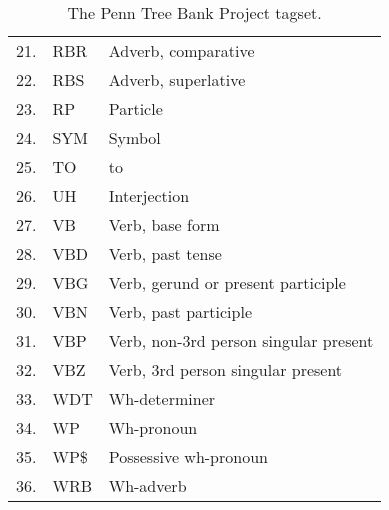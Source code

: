\documentclass[
	a4paper,
	pdftex,
	12pt,	
	footinclude=true,
	fleqn,
	final,
	]{report}%
\begin{document}
\begin{table}[h]
\begin{tabular}{m{1cm} m{2cm} m{9cm}}
21.    & RBR   & Adverb, comparative                      \\
22.    & RBS   & Adverb, superlative                      \\
23.    & RP    & Particle                                 \\
24.    & SYM   & Symbol                                   \\
25.    & TO    & to                                       \\
26.    & UH    & Interjection                             \\
27.    & VB    & Verb, base form                          \\
28.    & VBD   & Verb, past tense                         \\
29.    & VBG   & Verb, gerund or present participle       \\
30.    & VBN   & Verb, past participle                    \\
31.    & VBP   & Verb, non-3rd person singular present    \\
32.    & VBZ   & Verb, 3rd person singular present        \\
33.    & WDT   & Wh-determiner                            \\
34.    & WP    & Wh-pronoun                               \\
35.    & WP\$  & Possessive wh-pronoun                    \\
36.    & WRB   & Wh-adverb                                \\ \bottomrule
\end{tabular}%
\caption[The Penn Tree Bank Project tagset.]{\small \centering The Penn Tree Bank Project tagset.}
\label{t:16}
\end{table}
\vspace{-0.5cm}
\vspace{-0.4cm}
\end{document}
